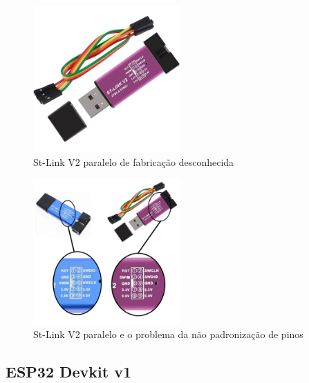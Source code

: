 \begin{figure}[htb]
	\centering
	\includegraphics[width=0.5\textwidth]{figures/stlinkv2_cheap}
	\caption{St-Link V2 paralelo de fabricação desconhecida}
    \label{stlinkv2_cheap}
\end{figure}


\begin{figure}[htb]
	\centering
	\includegraphics[width=0.5\textwidth]{figures/stlinkv2_cheap_pin_diff}
	\caption{St-Link V2 paralelo e o problema da não padronização de pinos}
    \label{stlinkv2_cheap}
\end{figure}





\subsection{ESP32 Devkit v1}








